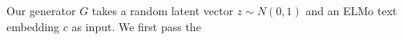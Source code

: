 Our generator $G$ takes a random latent vector $z \sim N(0, 1)$ and an ELMo text embedding $c$ as input. We first pass the 